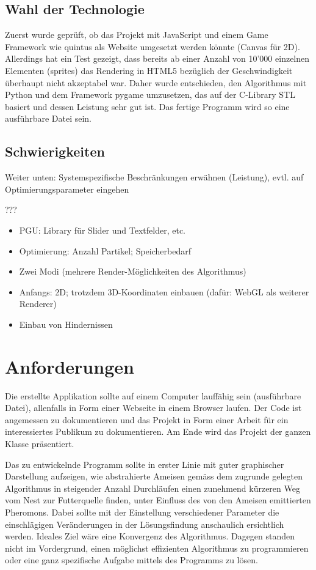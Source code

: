 \subsection{Wahl der Technologie}

Zuerst wurde geprüft, ob das Projekt mit JavaScript und einem Game Framework wie quintus als Website umgesetzt werden könnte (Canvas für 2D). Allerdings hat ein Test gezeigt, dass bereits ab einer Anzahl von 10'000 einzelnen Elementen (sprites) das Rendering in HTML5 bezüglich der Geschwindigkeit überhaupt nicht akzeptabel war. Daher wurde entschieden, den Algorithmus mit Python und dem Framework pygame umzusetzen, das auf der C-Library STL basiert und dessen Leistung sehr gut ist. Das fertige Programm wird so eine ausführbare Datei sein.



\subsection{Schwierigkeiten}

Weiter unten: Systemspezifische Beschränkungen erwähnen (Leistung), evtl. auf Optimierungsparameter eingehen

???
\begin{itemize}[noitemsep]
\item PGU: Library für Slider und Textfelder, etc.
\item Optimierung: Anzahl Partikel; Speicherbedarf
\item Zwei Modi (mehrere Render-Möglichkeiten des Algorithmus)
\item Anfangs: 2D; trotzdem 3D-Koordinaten einbauen (dafür: WebGL als weiterer Renderer)
\item Einbau von Hindernissen
\end{itemize}




\section{Anforderungen}

Die erstellte Applikation sollte auf einem Computer lauffähig sein (ausführbare Datei), allenfalls in Form einer Webseite in einem Browser laufen. Der Code ist angemessen zu dokumentieren und das Projekt in Form einer Arbeit für ein interessiertes Publikum zu dokumentieren. Am Ende wird das Projekt der ganzen Klasse präsentiert.

Das zu entwickelnde Programm sollte in erster Linie mit guter graphischer Darstellung aufzeigen, wie abstrahierte Ameisen gemäss dem zugrunde gelegten Algorithmus in steigender Anzahl Durchläufen einen zunehmend kürzeren Weg vom Nest zur Futterquelle finden, unter Einfluss des von den Ameisen emittierten Pheromons. Dabei sollte mit der Einstellung verschiedener Parameter die einschlägigen Veränderungen in der Lösungsfindung anschaulich ersichtlich werden. Ideales Ziel wäre eine Konvergenz des Algorithmus. Dagegen standen nicht im Vordergrund, einen möglichst effizienten Algorithmus zu programmieren oder eine ganz spezifische Aufgabe mittels des Programms zu lösen. \\



